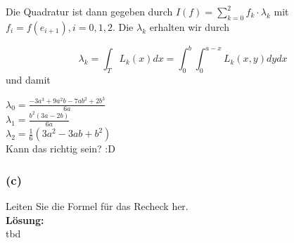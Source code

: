 \documentclass[11pt,a4paper,ngerman]{article}
\begin{document}
%
%

Die Quadratur ist dann gegeben durch $I(f) = \sum_{k=0}^2 f_k \cdot \lambda_k$ mit $f_i = f(e_{i+1}), i = 0,1,2$. Die $\lambda_k$ erhalten wir durch

\begin{equation*}
\lambda_k = \int_T L_k(x) dx = \int_0^b \int_0^{a-x} L_k(x,y) dy dx
\end{equation*}
und damit

$\lambda_0 = \frac{-3a^3+9a^2b-7ab^2 + 2b^3}{6a}$ \\
$\lambda_1 = \frac{b^2 (3a - 2b)}{6a}$ \\
$\lambda_2 = \frac{1}{6}(3a^2 - 3ab+b^2)$ \\

Kann das richtig sein? :D
\subsubsection*{(c)}
Leiten Sie die Formel für das Recheck her.\\

\textbf{Lösung:}\\
tbd


\label{LastPage}
\end{document}
